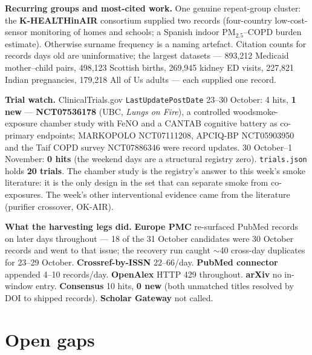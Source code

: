 \documentclass[10pt]{article}
\begin{document}
\vspace{1.5mm}
\textbf{Recurring groups and most-cited work.} One genuine repeat-group cluster: the \textbf{K-HEALTHinAIR}
consortium supplied two records (four-country low-cost-sensor monitoring of homes and schools; a Spanish indoor
PM$_{2.5}$--COPD burden estimate). Otherwise surname frequency is a naming artefact. Citation counts for records
days old are uninformative; the largest datasets --- 893,212 Medicaid mother--child pairs, 498,123 Scottish births,
269,945 kidney ED visits, 227,821 Indian pregnancies, 179,218 All of Us adults --- each supplied one record.

\vspace{1.5mm}
\textbf{Trial watch.} ClinicalTrials.gov \texttt{LastUpdatePostDate} 23--30 October: 4 hits, \textbf{1 new}
--- \textbf{NCT07536178} (UBC, \emph{Lungs on Fire}), a controlled woodsmoke-exposure chamber study with FeNO and a
CANTAB cognitive battery as co-primary endpoints; MARKOPOLO NCT07111208, APCIQ-BP NCT05903950 and the Taif COPD
survey NCT07886346 were record updates. 30 October--1 November: \textbf{0 hits} (the weekend days are a structural
registry zero). \texttt{trials.json} holds \textbf{20 trials}. The chamber study is the registry's answer to this
week's smoke literature: it is the only design in the set that can separate smoke from co-exposures. The week's
other interventional evidence came from the literature (purifier crossover, OK-AIR).

\vspace{1.5mm}
\textbf{What the harvesting legs did.} \textbf{Europe PMC} re-surfaced PubMed records on later days throughout
--- 18 of the 31 October candidates were 30 October records and went to that issue; the recovery run caught $\sim$40
cross-day duplicates for 23--29 October. \textbf{Crossref-by-ISSN} 22--66/day. \textbf{PubMed connector} appended
4--10 records/day. \textbf{OpenAlex} HTTP 429 throughout. \textbf{arXiv} no in-window entry. \textbf{Consensus}
10 hits, \textbf{0 new} (both unmatched titles resolved by DOI to shipped records). \textbf{Scholar Gateway} not called.

\vspace{2mm}
\section*{\sffamily\bfseries\color{Deep}Open gaps}
\vspace{-1.5mm}{\color{Teal}\rule{\linewidth}{1.1pt}}\vspace{2.5mm}
\end{document}
